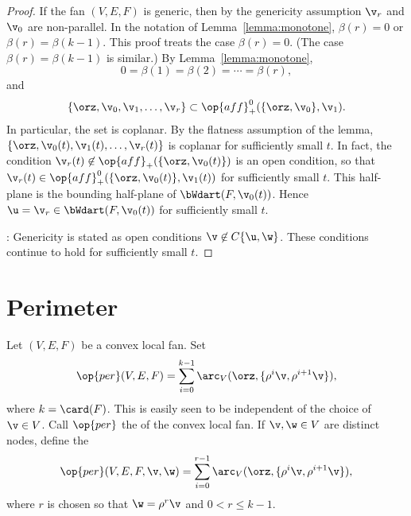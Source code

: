 \begin{proof}
If the fan $(V,E,F)$ is generic, then
by the genericity assumption $\v_r$ and
$\v_0$ are non-parallel.  In the notation of
Lemma~\ref{lemma:monotone}, $\beta(r) = 0$ or $\beta(r) =
\beta(k-1)$.  This proof treats the case $\beta(r)=0$. (The case
$\beta(r)=\beta(k-1)$ is similar.)  By Lemma~\ref{lemma:monotone},
\begin{displaymath}0=\beta(1)=\beta(2)=\cdots=\beta(r),\end{displaymath}
and 
\begin{displaymath}
\{\orz,\v_0,\v_1,\ldots,\v_r\} \subset \op{aff}^0_+(\{\orz,\v_0\},\v_1).
\end{displaymath}
In particular, the set is coplanar.  By the flatness assumption of
the lemma, $\{\orz,\v_0(t),\v_1(t),\ldots,\v_r(t)\}$ is coplanar for
sufficiently small $t$.  In fact, the condition $\v_r(t)\not\in
\op{aff}_+(\{\orz,\v_0(t)\})$ is an open condition, so that
$\v_r(t)\in \op{aff}^0_+(\{\orz,\v_0(t)\},\v_1(t))$ for sufficiently
small $t$.  This half-plane is the bounding half-plane of
$\bWdart(F,\v_0(t))$.  Hence $\u = \v_r\in \bWdart(F,\v_0(t))$ for
sufficiently small $t$.

: Genericity is stated as open conditions $\v\not\in
C\{\u,\w\}$.  These conditions continue to hold for sufficiently small
$t$.
\end{proof}






\section{Perimeter}


\begin{definition}[perimeter]\label{lemma:perim}
Let $(V,E,F)$ be a convex local fan.    Set
\begin{displaymath}
  \op{per}(V,E,F) 
= \sum_{i=0}^{k-1} \arc_V(\orz,\{\rho^i \v,\rho^{i+1} \v\}), 
\end{displaymath}
where $k=\card(F)$.  This is easily seen to be independent of the
choice of $\v\in V$.  Call $\op{per}$ the  of the convex local fan.
If $\v,\w\in V$ are distinct nodes, define the 
\begin{displaymath}
  \op{per}(V,E,F,\v,\w) 
= \sum_{i=0}^{r-1} \arc_V(\orz,\{\rho^i \v,\rho^{i+1} \v\}), 
\end{displaymath}
where $r$ is chosen so that $\w=\rho^r \v$ and $0<r\le k-1$.
\end{definition}
%
%
%



